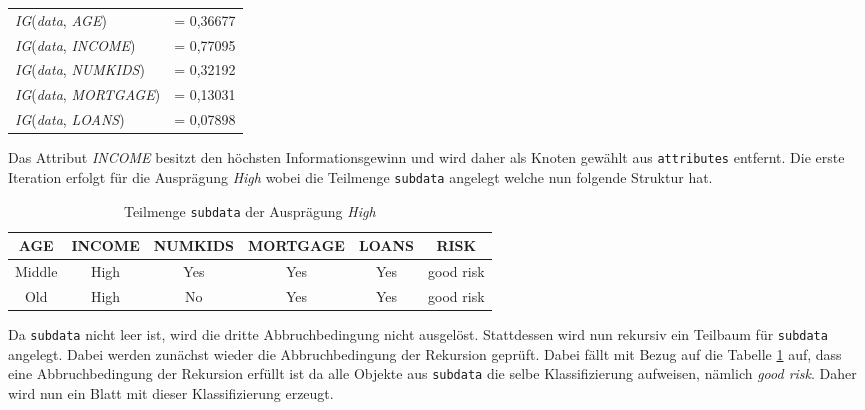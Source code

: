 \begin{table}[htbp]
    \centering
    \begin{tabular}{lc}
        \textit{IG}(\textit{data}, \textit{AGE})       &= 0,36677 \\ 
        \textit{IG}(\textit{data}, \textit{INCOME})    &= 0,77095 \\ 
        \textit{IG}(\textit{data}, \textit{NUMKIDS})   &= 0,32192 \\ 
        \textit{IG}(\textit{data}, \textit{MORTGAGE})  &= 0,13031 \\ 
        \textit{IG}(\textit{data}, \textit{LOANS})     &= 0,07898 \\
    \end{tabular}
\end{table}

Das Attribut \textit{INCOME} besitzt den höchsten Informationsgewinn und wird daher als Knoten gewählt aus \texttt{attributes} entfernt. Die erste Iteration erfolgt für die Ausprägung \textit{High} wobei die Teilmenge \texttt{subdata} angelegt welche nun folgende Struktur hat.

\begin{table}[htbp]
    \centering
    \begin{tabularx}{\linewidth}{cccccc}
        \toprule
        \textbf{AGE} & \textbf{INCOME} & \textbf{NUMKIDS} & \textbf{MORTGAGE} & \textbf{LOANS} & \textbf{RISK} \\
        \toprule
        Middle & High      & Yes &     Yes &  Yes &  good risk \\
        Old    & High      & No  &     Yes &  Yes &  good risk \\
        \bottomrule
    \end{tabularx}
    \caption{Teilmenge \texttt{subdata} der Ausprägung \textit{High}}
    \label{table:subdata-high}
\end{table}

Da \texttt{subdata} nicht leer ist, wird die dritte Abbruchbedingung nicht ausgelöst. Stattdessen wird nun rekursiv ein Teilbaum für \texttt{subdata} angelegt. Dabei werden zunächst wieder die Abbruchbedingung der Rekursion geprüft. Dabei fällt mit Bezug auf die Tabelle \ref{table:subdata-high} auf, dass eine Abbruchbedingung der Rekursion erfüllt ist da alle Objekte aus \texttt{subdata} die selbe Klassifizierung aufweisen, nämlich \textit{good risk}. Daher wird nun ein Blatt mit dieser Klassifizierung erzeugt.

